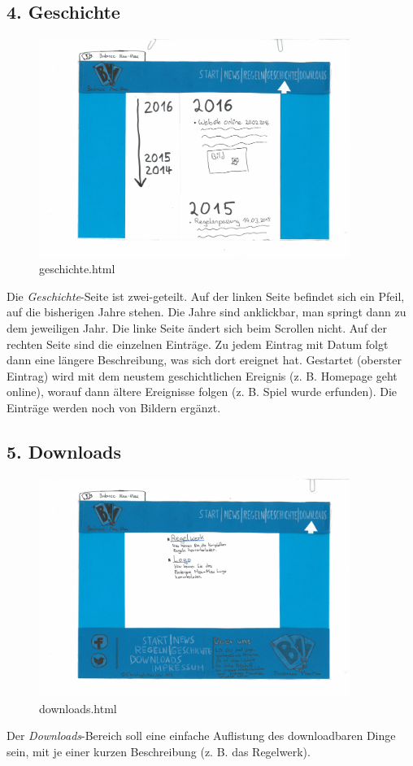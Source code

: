 \documentclass{scrartcl}
\begin{document}
\subsection*{4. Geschichte}
  \begin{figure}[H]
 \begin{center}
 \includegraphics[width=0.9\textwidth]{geschichte.jpg}
\caption{geschichte.html}
 \end{center}
\end{figure}  
 Die \textit{Geschichte}-Seite ist zwei-geteilt. Auf der linken Seite befindet sich ein Pfeil, auf die bisherigen Jahre stehen. Die Jahre sind anklickbar, man springt dann zu dem jeweiligen Jahr.  Die linke Seite ändert sich beim Scrollen nicht. Auf der rechten Seite sind die einzelnen Einträge. Zu jedem Eintrag mit Datum folgt dann eine längere Beschreibung, was sich dort ereignet hat. Gestartet (oberster Eintrag) wird mit dem neustem geschichtlichen Ereignis (z. B. Homepage geht online), worauf dann ältere Ereignisse folgen (z. B. Spiel wurde erfunden). Die Einträge werden noch von Bildern ergänzt.

\subsection*{5. Downloads}
  \begin{figure}[H]
 \begin{center}
 \includegraphics[width=0.9\textwidth]{downloads.jpg}
\caption{downloads.html}
 \end{center}
\end{figure}  
  Der \textit{Downloads}-Bereich soll eine einfache Auflistung des downloadbaren Dinge sein, mit je einer kurzen Beschreibung (z. B. das Regelwerk).
\end{document}
